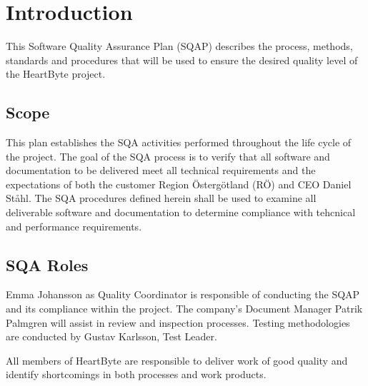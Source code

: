 \documentclass{article}
\begin{document}
	
	\clearpage
	
	
	\clearpage
	
	\tableofcontents
	\clearpage
	
	\section{Introduction}
	This Software Quality Assurance Plan (SQAP) describes the process, methods, standards and procedures that will be used to ensure the desired quality level of the HeartByte project.
	
	\subsection{Scope}
	This plan establishes the SQA activities performed throughout the life cycle of the project. The goal of the SQA process is to verify that all software and documentation to be delivered meet all technical requirements and the expectations of both the customer Region Östergötland (RÖ) and CEO Daniel Ståhl. The SQA procedures defined herein shall be used to examine all deliverable software and documentation to determine compliance with tehcnical and performance requirements. 
	

	\subsection{SQA Roles}
	Emma Johansson as Quality Coordinator is responsible of conducting the SQAP and its compliance within the project. The company's Document Manager Patrik Palmgren will assist in review and inspection processes. Testing methodologies are conducted by Gustav Karlsson, Test Leader. 
	
	All members of HeartByte are responsible to deliver work of good quality and identify shortcomings in both processes and work products.
	
	
	
	\clearpage
\end{document}
